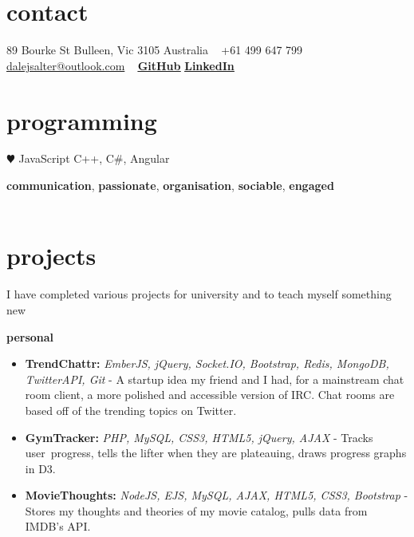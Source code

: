 \documentclass[]{friggeri-cv} %
\begin{document}

\begin{aside} %
\section{contact}
89 Bourke St
Bulleen, Vic 3105
Australia
~
+61 499 647 799
~
\href{mailto:dalejsalter@outlook.com}{dalejsalter@outlook.com}
~
\underline{\textbf{\href{https://github.com/Compulsed/}{GitHub}}}
\underline{\textbf{\href{https://au.linkedin.com/in/dalesalter}{LinkedIn}}}
\section{programming}
{\color{red} $\varheartsuit$} JavaScript
C++, C\#, Angular
\end{aside}


\textbf{communication}, \textbf{passionate}, \textbf{organisation}, \textbf{sociable}, \textbf{engaged} \\ \\

\section{projects}
I have completed various projects for university and to teach myself something new

{
  \large\textbf{personal}
}
\begin{itemize}
    \item \textbf{TrendChattr:} \emph{EmberJS, jQuery, Socket.IO, Bootstrap, Redis, MongoDB, TwitterAPI, Git} -
        A startup idea my friend and I had, for a mainstream chat room client, a more polished
         and accessible version of IRC.
        Chat rooms are based off of the trending topics on Twitter.
    \item \textbf{GymTracker:} \emph{PHP, MySQL, CSS3, HTML5, jQuery, AJAX} -
        Tracks user progress, tells the lifter when they are plateauing, draws progress graphs in D3.
    \item \textbf{MovieThoughts:} \emph{NodeJS, EJS, MySQL, AJAX, HTML5, CSS3, Bootstrap} -
        Stores my thoughts and theories of my movie catalog, pulls data from IMDB's API.
\end{itemize}
\end{document}
